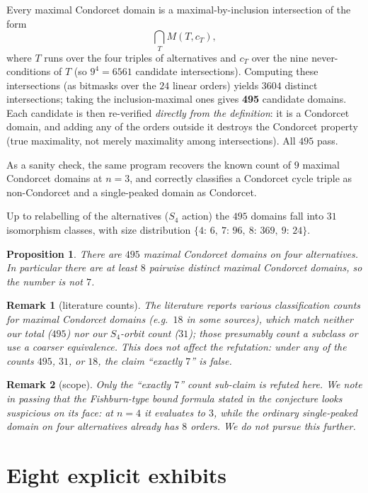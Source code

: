 \documentclass[11pt]{article}
\newtheorem{proposition}{Proposition}
\newtheorem{remark}{Remark}
\begin{document}
Every maximal Condorcet domain is a maximal-by-inclusion intersection of the
form
\[
  \bigcap_T M(T, c_T),
\]
where $T$ runs over the four triples of alternatives and $c_T$ over the nine
never-conditions of $T$ (so $9^4 = 6561$ candidate intersections).  Computing
these intersections (as bitmasks over the $24$ linear orders) yields $3604$
distinct intersections; taking the inclusion-maximal ones gives \textbf{495}
candidate domains.  Each candidate is then re-verified \emph{directly from the
definition}: it is a Condorcet domain, and adding any of the orders outside it
destroys the Condorcet property (true maximality, not merely maximality among
intersections).  All $495$ pass.

As a sanity check, the same program recovers the known count of $9$ maximal
Condorcet domains at $n=3$, and correctly classifies a Condorcet cycle triple
as non-Condorcet and a single-peaked domain as Condorcet.

Up to relabelling of the alternatives ($S_4$ action) the $495$ domains fall
into $31$ isomorphism classes, with size distribution
$\{4{:}\,6,\ 7{:}\,96,\ 8{:}\,369,\ 9{:}\,24\}$.

\begin{proposition}
  There are $495$ maximal Condorcet domains on four alternatives.  In
  particular there are at least $8$ pairwise distinct maximal Condorcet
  domains, so the number is not $7$.
\end{proposition}

\begin{remark}[literature counts]
  The literature reports various classification counts for maximal Condorcet
  domains (e.g.\ $18$ in some sources), which match neither our total ($495$)
  nor our $S_4$-orbit count ($31$); those presumably count a subclass or use a
  coarser equivalence.  This does not affect the refutation: under \emph{any}
  of the counts $495$, $31$, or $18$, the claim ``exactly $7$'' is false.
\end{remark}

\begin{remark}[scope]
  Only the ``exactly $7$'' count sub-claim is refuted here.  We note in passing
  that the Fishburn-type bound formula stated in the conjecture looks
  suspicious on its face: at $n=4$ it evaluates to $3$, while the ordinary
  single-peaked domain on four alternatives already has $8$ orders.  We do not
  pursue this further.
\end{remark}

\section{Eight explicit exhibits}
\end{document}
